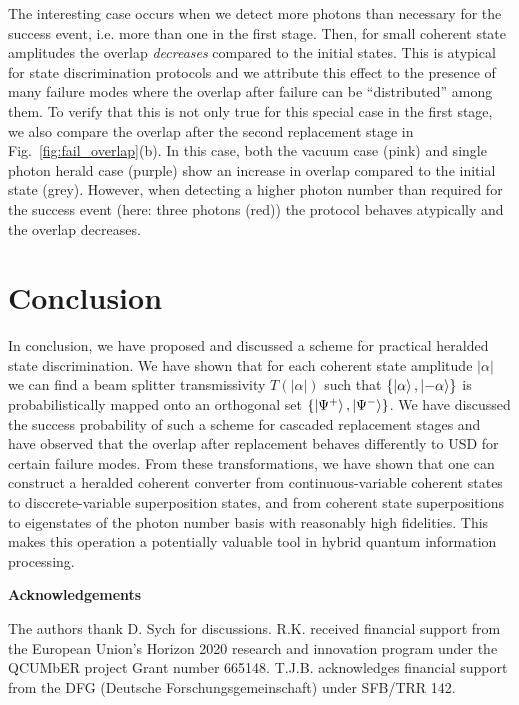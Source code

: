 \documentclass[aps,prl,twocolumn, superscriptaddress]{revtex4-1}
\begin{document}
The interesting case occurs when we detect more photons than necessary for the success event, i.e. more than one in the first stage. Then, for small coherent state amplitudes the overlap \textit{decreases} compared to the initial states. This is atypical for state discrimination protocols and we attribute this effect to the presence of many failure modes where the overlap after failure can be ``distributed'' among them.
To verify that this is not only true for this special case in the first stage, we also compare the overlap after the second replacement stage in Fig.~\ref{fig:fail_overlap}(b). In this case, both the vacuum case (pink) and single photon herald case (purple) show an increase in overlap compared to the initial state (grey). However, when detecting a higher photon number than required for the success event (here: three photons (red)) the protocol behaves atypically and the overlap decreases.

\section{Conclusion}
In conclusion, we have proposed and discussed a scheme for practical heralded state discrimination. We have shown that for each coherent state amplitude $|\alpha|$ we can find a beam splitter transmissivity $T(|\alpha|)$ such that $\{\ket{\alpha},\ket{-\alpha}\}$ is probabilistically mapped onto an orthogonal set $\{\ket{\Psi^+},\ket{\Psi^-}\}$. We have discussed the success probability of such a scheme for cascaded replacement stages and have observed that the overlap after replacement behaves differently to USD for certain failure modes. From these transformations, we have shown that one can construct a heralded coherent converter from continuous-variable coherent states to disccrete-variable superposition states, and from coherent state superpositions to eigenstates of the photon number basis with reasonably high fidelities. This makes this operation a potentially valuable tool in hybrid quantum information processing.

\vspace{0.5cm}
\textbf{Acknowledgements}\par
The authors thank D. Sych for discussions. R.K. received financial support from the European Union’s Horizon 2020 research and innovation program under the QCUMbER project Grant number 665148. T.J.B. acknowledges financial support from the DFG (Deutsche Forschungsgemeinschaft) under SFB/TRR 142.

\clearpage
\onecolumngrid
%
\end{document}
